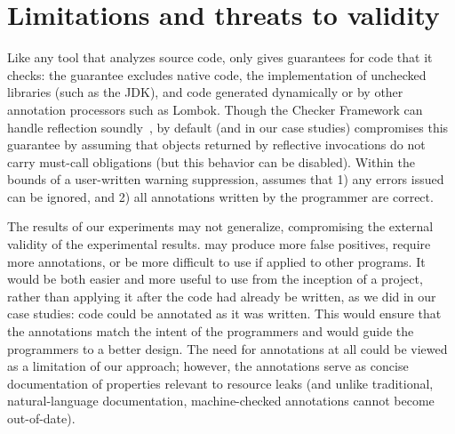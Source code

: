 \section{Limitations and threats to validity}
\label{sec:threats}

Like any tool that analyzes source code, \tool only
gives guarantees for code that it checks: the guarantee
excludes native code, the implementation of unchecked libraries (such as the JDK),
and code generated dynamically or by other annotation processors
such as Lombok.
Though
the Checker Framework can handle 
reflection soundly~\cite{BarrosJMVDdAE2015}, by default (and in our case studies)
\tool compromises this guarantee
by assuming that objects returned by reflective invocations
do not carry must-call obligations (but this behavior can
be disabled).
Within the bounds
of a user-written warning suppression, \tool assumes that 1)
any errors issued can be ignored, and 2) all annotations
written by the programmer are correct.

The results of our experiments may not generalize, compromising the
external validity of the experimental results.
\Tool may produce more false positives, require
more annotations, or be more difficult to use if applied to other
programs.  It would be both easier and more useful to use \tool from
the inception of a project, rather than applying it after the code had
already be written, as we did in our case studies: code could be
annotated as it was written.  This would ensure that the annotations match
the intent of the programmers and would guide the programmers to a better design.
The need for annotations at all could be viewed as a limitation of our approach;
however, the annotations serve as concise documentation of
properties relevant to resource leaks (and unlike traditional, natural-language
documentation, machine-checked annotations cannot become out-of-date).

